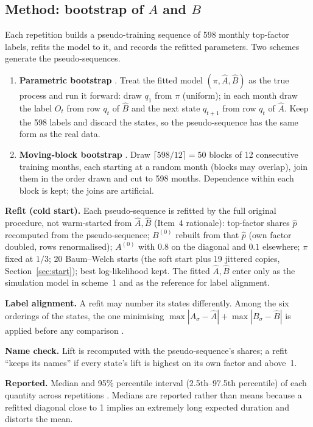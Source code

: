 \documentclass[11pt]{article}
\begin{document}
\subsection{Method: bootstrap of $A$ and $B$}
Each repetition builds a pseudo-training sequence of 598 monthly top-factor labels, refits the model to it, and records the refitted parameters. Two schemes generate the pseudo-sequences.
\begin{enumerate}
\item \textbf{Parametric bootstrap} \citep{efron1993,visser2000}. Treat the fitted model $(\pi,\hat A,\hat B)$ as the true process and run it forward: draw $q_1$ from $\pi$ (uniform); in each month draw the label $O_t$ from row $q_t$ of $\hat B$ and the next state $q_{t+1}$ from row $q_t$ of $\hat A$. Keep the 598 labels and discard the states, so the pseudo-sequence has the same form as the real data.
\item \textbf{Moving-block bootstrap} \citep{kunsch1989,lahiri2003}. Draw $\lceil 598/12\rceil=50$ blocks of 12 consecutive training months, each starting at a random month (blocks may overlap), join them in the order drawn and cut to 598 months. Dependence within each block is kept; the joins are artificial.
\end{enumerate}
\textbf{Refit (cold start).} Each pseudo-sequence is refitted by the full original procedure, not warm-started from $\hat A,\hat B$ (Item~4 rationale): top-factor shares $\hat p$ recomputed from the pseudo-sequence; $B^{(0)}$ rebuilt from that $\hat p$ (own factor doubled, rows renormalised); $A^{(0)}$ with $0.8$ on the diagonal and $0.1$ elsewhere; $\pi$ fixed at $1/3$; 20 Baum--Welch starts (the soft start plus 19 jittered copies, Section~\ref{sec:start}); best log-likelihood kept. The fitted $\hat A,\hat B$ enter only as the simulation model in scheme~1 and as the reference for label alignment.

\textbf{Label alignment.} A refit may number its states differently. Among the six orderings of the states, the one minimising $\max|A_\sigma-\hat A|+\max|B_\sigma-\hat B|$ is applied before any comparison \citep{stephens2000}.

\textbf{Name check.} Lift is recomputed with the pseudo-sequence's shares; a refit ``keeps its names'' if every state's lift is highest on its own factor and above~1.

\textbf{Reported.} Median and 95\% percentile interval (2.5th--97.5th percentile) of each quantity across repetitions \citep{efron1993}. Medians are reported rather than means because a refitted diagonal close to 1 implies an extremely long expected duration and distorts the mean.
\end{document}
